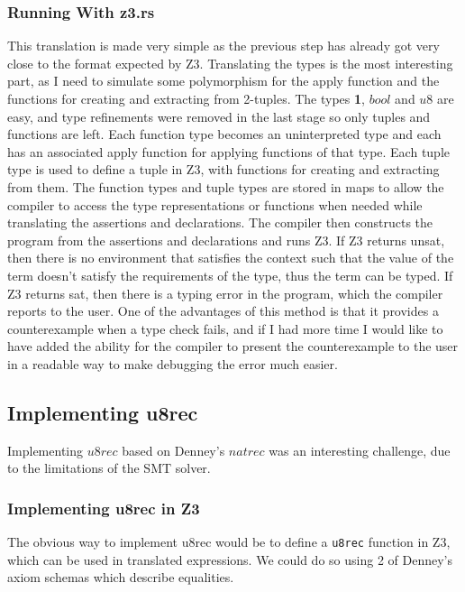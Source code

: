 \subsubsection{Running With z3.rs}

This translation is made very simple as the previous step has already got very close to the format
expected by Z3.
Translating the types is the most interesting part, as I need to simulate some polymorphism for
the apply function and the functions for creating and extracting from 2-tuples.
The types \textbf{1}, $bool$ and $u8$ are easy, and type refinements were removed in the last
stage so only tuples and functions are left.
Each function type becomes an uninterpreted type and each has an associated apply function for
applying functions of that type.
Each tuple type is used to define a tuple in Z3, with functions for creating and extracting from
them.
The function types and tuple types are stored in maps to allow the compiler to access the type
representations or functions when needed while translating the assertions and declarations.
The compiler then constructs the program from the assertions and declarations and runs Z3.
If Z3 returns unsat, then there is no environment that satisfies the context such that the value
of the term doesn't satisfy the requirements of the type, thus the term can be typed.
If Z3 returns sat, then there is a typing error in the program, which the compiler reports to the
user.
One of the advantages of this method is that it provides a counterexample when a type check fails,
and if I had more time I would like to have added the ability for the compiler to present the
counterexample to the user in a readable way to make debugging the error much easier.

\subsection{Implementing u8rec}

Implementing $u8rec$ based on Denney's $natrec$ was an interesting challenge, due to the limitations
of the SMT solver.

\subsubsection{Implementing u8rec in Z3}

The obvious way to implement u8rec would be to define a \texttt{u8rec} function in Z3, which can be
used in translated expressions.
We could do so using 2 of Denney's axiom schemas which describe equalities.

